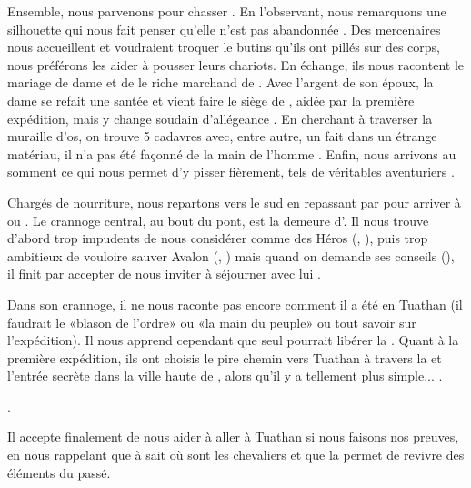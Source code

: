 \documentclass[11pt]{article}
\begin{document}
Ensemble, nous parvenons \sousmuraille{} pour chasser . En l'observant, nous remarquons une silhouette qui nous fait penser qu'elle n'est pas abandonnée \gain{\nrj[1]}. Des mercenaires nous accueillent et voudraient troquer le butins qu'ils ont pillés sur des corps, nous préférons les aider à pousser leurs chariots. En échange, ils nous racontent le mariage de dame \kincaid{} et de \ultan{} le riche marchand de \boismuraille. Avec l'argent de son époux, la dame se refait une santée et vient faire le siège de \boismuraille{}, aidée par la première expédition, mais \yvain{} y change soudain d'allégeance . En cherchant à traverser la muraille d'os, on trouve 5 cadavres avec, entre autre, un \talismanterni{} fait dans un étrange matériau, il n'a pas été façonné de la main de l'homme . Enfin, nous arrivons au somment ce qui nous permet d'y pisser fièrement, tels de véritables aventuriers .

Chargés de nourriture, nous repartons vers le sud en repassant par \debacle{} pour arriver à \bordwyrd{}  ou . Le crannoge central, au bout du pont, est la demeure d'\orrin{}. Il nous trouve d'abord trop impudents de nous considérer comme des Héros (, \rep[-2]), puis trop ambitieux de vouloire sauver Avalon (, \rep[-2]) mais quand on demande ses conseils (), il finit par accepter de nous inviter à séjourner avec lui .

Dans son crannoge, il ne nous raconte pas encore comment il a été en Tuathan (il faudrait le «blason de l'ordre» ou «la main du peuple» ou tout savoir sur l'expédition). Il nous apprend cependant que seul \arthur{} pourrait libérer la \flotte{}. Quant à la première expédition, ils ont choisis le pire chemin vers Tuathan à travers la \valleegardiens{} et l'entrée secrète dans la ville haute de \boismuraille{}, alors qu'il y a tellement plus simple... .

.

Il accepte finalement de nous aider à aller à Tuathan si nous faisons nos preuves, en nous rappelant que \lancelot{} à \newcamelot{} sait où sont les chevaliers et que la \tetesereine{} permet de revivre des éléments du passé.
\end{document}
